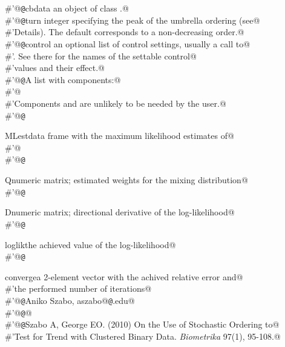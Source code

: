 \documentclass[reqno]{amsart}
\begin{document}
\begin{flushleft}
\begin{list}{}{}
\mbox{}\verb@#'@{\tt @}\verb@param cbdata an object of class .@\\
\mbox{}\verb@#'@{\tt @}\verb@param turn integer specifying the peak of the umbrella ordering (see@\\
\mbox{}\verb@#'Details). The default corresponds to a non-decreasing order.@\\
\mbox{}\verb@#'@{\tt @}\verb@param control an optional list of control settings, usually a call to@\\
\mbox{}\verb@#'.  See there for the names of the settable control@\\
\mbox{}\verb@#'values and their effect.@\\
\mbox{}\verb@#'@{\tt @}\verb@return A list with components:@\\
\mbox{}\verb@#'@\\
\mbox{}\verb@#'Components  and  are unlikely to be needed by the user.@\\
\mbox{}\verb@#'@{\tt @}\verb@return \item{MLest}{data frame with the maximum likelihood estimates of@\\
\mbox{}\verb@#'}@\\
\mbox{}\verb@#'@{\tt @}\verb@return \item{Q}{numeric matrix; estimated weights for the mixing distribution}@\\
\mbox{}\verb@#'@{\tt @}\verb@return \item{D}{numeric matrix; directional derivative of the log-likelihood}@\\
\mbox{}\verb@#'@{\tt @}\verb@return \item{loglik}{the achieved value of the log-likelihood}@\\
\mbox{}\verb@#'@{\tt @}\verb@return \item{converge}{a 2-element vector with the achived relative error and@\\
\mbox{}\verb@#'the performed number of iterations}@\\
\mbox{}\verb@#'@{\tt @}\verb@author Aniko Szabo, aszabo@{\tt @}\verb@mcw.edu@\\
\mbox{}\verb@#'@{\tt @}\verb@seealso {}@\\
\mbox{}\verb@#'@{\tt @}\verb@references Szabo A, George EO. (2010) On the Use of Stochastic Ordering to@\\
\mbox{}\verb@#'Test for Trend with Clustered Binary Data. \emph{Biometrika} 97(1), 95-108.@\\

\end{list}
\end{flushleft}
\end{document}
